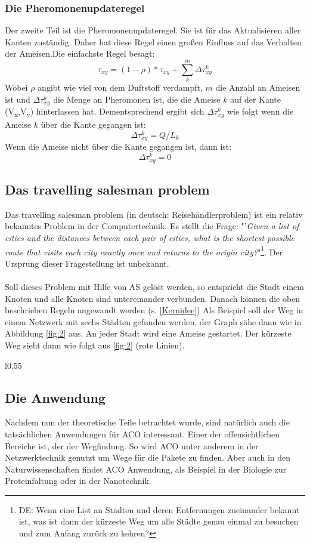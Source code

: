 \documentclass[12pt]{article}
\begin{document}
\subsubsection{Die Pheromonenupdateregel}
Der zweite Teil ist die Pheromonenupdateregel. Sie ist für das Aktualisieren aller Kanten zuständig. Daher hat diese Regel einen großen Einfluss auf das Verhalten der Ameisen.Die einfachste Regel besagt: \[\tau_{xy}= (1-\rho)*\tau_{xy}+\sum_{k}^{m}{ \Delta\tau^k_{xy}} \]
Wobei $\rho$ angibt wie viel von dem Duftstoff verdampft, $m$ die Anzahl an Ameisen ist und $\Delta\tau^k_{xy}$ die Menge an Pheromonen ist, die die Ameise $k$ auf der Kante (V\textsubscript{x},V\textsubscript{y}) hinterlassen hat. Dementsprechend ergibt sich $\Delta\tau^k_{xy}$ wie folgt wenn die Ameise $k$ über die Kante gegangen ist:\[\Delta\tau^k_{xy}=Q/L_k\] Wenn die Ameise nicht über die Kante gegangen ist, dann ist: \[\Delta\tau^k_{xy}=0\]
\subsection{Das travelling salesman problem}\label{TSP}
Das travelling salesman problem (in deutsch: Reisehändlerproblem) ist ein relativ bekanntes Problem 
in der Computertechnik. Es stellt die Frage:
"'\textit{Given a list of cities and the distances between each pair of cities, what is the shortest possible route that visits each city exactly once and returns to the origin city?}"\cite{wiki_TSP}\footnote{DE: Wenn eine List an Städten und deren Entfernungen zueinander bekannt ist, was ist dann der kürzeste Weg um alle Städte genau einmal zu besuchen und zum Anfang zurück zu kehren?}. Der Ursprung dieser Fragestellung ist unbekannt.\\\\
Soll dieses Problem mit Hilfe von AS gelöst werden, so entspricht die Stadt einem Knoten und alle Knoten sind untereinander verbunden. Danach können die oben beschrieben Regeln angewandt werden (s. \ref{Kernidee})
Als Beispiel soll der Weg in einem Netzwerk mit sechs Städten gefunden werden, der Graph sähe dann wie in Abbildung \ref{fig:2} aus. An jeder Stadt wird eine Ameise gestartet. Der kürzeste Weg \cite{aco-sim} sieht dann wie folgt aus \ref{fig:2} (rote Linien).
\begin{wrapfigure}[13]{l}{0.55\textwidth}
\centering
{}
\caption{Netzwerk an Städten}
\label{fig:2}
\end{wrapfigure}
\subsection{Die Anwendung}
Nachdem nun der theoretische Teile betrachtet wurde, sind natürlich auch die tatsächlichen Anwendungen für ACO interessant. Einer der offensichtlichen Bereiche ist, der der Wegfindung. So wird ACO unter anderem in der Netzwerktechnik genutzt um Wege für die Pakete zu finden. Aber auch in den Naturwissenschaften findet ACO Anwendung, als Beispiel in der Biologie zur Proteinfaltung oder in der Nanotechnik. 
\end{document}

